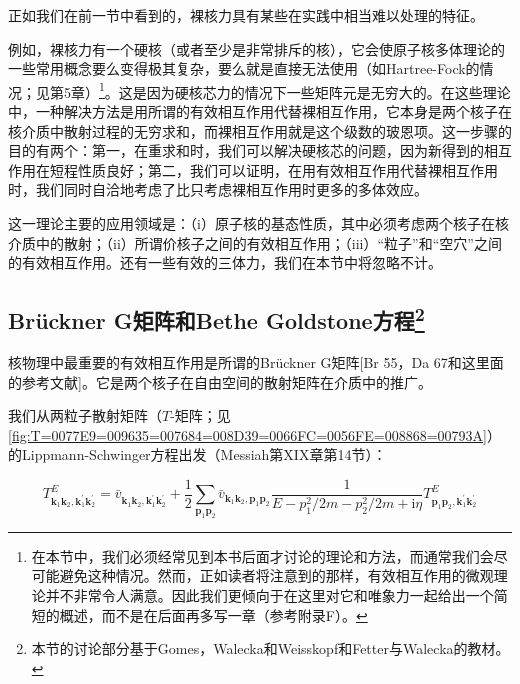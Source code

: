正如我们在前一节中看到的，裸核力具有某些在实践中相当难以处理的特征。

例如，裸核力有一个硬核（或者至少是非常排斥的核），它会使原子核多体理论的一些常用概念要么变得极其复杂，要么就是直接无法使用（如Hartree-Fock的情况；见第5章）\footnote{在本节中，我们必须经常见到本书后面才讨论的理论和方法，而通常我们会尽可能避免这种情况。然而，正如读者将注意到的那样，有效相互作用的微观理论并不非常令人满意。因此我们更倾向于在这里对它和唯象力一起给出一个简短的概述，而不是在后面再多写一章（参考附录F）。}。这是因为硬核芯力的情况下一些矩阵元是无穷大的。在这些理论中，一种解决方法是用所谓的有效相互作用代替裸相互作用，它本身是两个核子在核介质中散射过程的无穷求和，而裸相互作用就是这个级数的玻恩项。这一步骤的目的有两个：第一，在重求和时，我们可以解决硬核芯的问题，因为新得到的相互作用在短程性质良好；第二，我们可以证明，在用有效相互作用代替裸相互作用时，我们同时自洽地考虑了比只考虑裸相互作用时更多的多体效应。

这一理论主要的应用领域是：（i）原子核的基态性质，其中必须考虑两个核子在核介质中的散射；（ii）所谓价核子之间的有效相互作用；（iii）“粒子”和“空穴”之间的有效相互作用。还有一些有效的三体力，我们在本节中将忽略不计。

\subsection{Brückner G矩阵和Bethe Goldstone方程\protect\footnote{本节的讨论部分基于Gomes，Walecka和Weisskopf\cite{GWW58}和Fetter与Walecka\cite{FW71}的教材。}}

核物理中最重要的有效相互作用是所谓的Brückner G矩阵{[}Br 55，Da 67和这里面的参考文献{]}。它是两个核子在自由空间的散射矩阵在介质中的推广。

我们从两粒子散射矩阵（$T$-矩阵；见\ref{fig:T=0077E9=009635=007684=008D39=0066FC=0056FE=008868=00793A}）的Lippmann-Schwinger方程出发（Messiah\cite{Me61}第XIX章第14节）：

\begin{equation}
T^{E}_{\boldsymbol{k}_{1}\boldsymbol{k}_{2},\boldsymbol{k}^{\prime}_{1}\boldsymbol{k}^{\prime}_{2}}=\bar{v}_{\boldsymbol{k}_{1}\boldsymbol{k}_{2},\boldsymbol{k}^{\prime}_{1}\boldsymbol{k}^{\prime}_{2}}+\frac{1}{2}\sum_{\boldsymbol{p}_{1}\boldsymbol{p}_{2}}\bar{v}_{\boldsymbol{k}_{1}\boldsymbol{k}_{2},\boldsymbol{p}_{1}\boldsymbol{p}_{2}}\frac{1}{E-p^{2}_{1}/2m-p^{2}_{2}/2m+\mathrm{i}\eta}T^{E}_{\boldsymbol{p}_{1}\boldsymbol{p}_{2},\boldsymbol{k}^{\prime}_{1}\boldsymbol{k}^{\prime}_{2}}\label{eq:Lippmann-Schwinger equation}
\end{equation}

